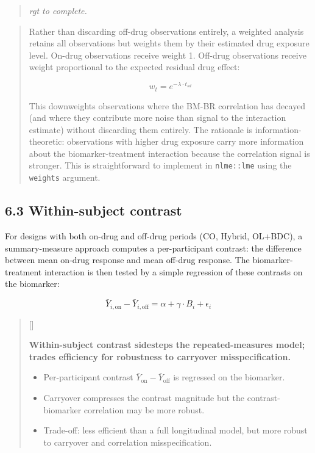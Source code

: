 \documentclass[
  11pt,
]{article}
\newcounter{pgraph}
\newenvironment{bullets}{%
  \stepcounter{pgraph}%
  \begin{quote}\small\sffamily\color[gray]{0.30}%
  {\normalfont\scriptsize\color[gray]{0.58}[\thepgraph]\enspace}}{%
  \end{quote}}
\newenvironment{rgt}{%
  \begin{quote}\small\itshape\color[RGB]{20,60,160}}{%
  \end{quote}}
\newenvironment{orig}{%
  \begin{quote}\normalsize\color[gray]{0.55}}{%
  \end{quote}}
\begin{document}
\begin{rgt}
rgt to complete.

\end{rgt}

\begin{orig}
Rather than discarding off-drug observations entirely, a weighted
analysis retains all observations but weights them by their estimated
drug exposure level. On-drug observations receive weight 1. Off-drug
observations receive weight proportional to the expected residual drug
effect:

\[w_t = e^{-\lambda \cdot t_{sd}}\]

This downweights observations where the BM-BR correlation has decayed
(and where they contribute more noise than signal to the interaction
estimate) without discarding them entirely. The rationale is
information-theoretic: observations with higher drug exposure carry more
information about the biomarker-treatment interaction because the
correlation signal is stronger. This is straightforward to implement in
\texttt{nlme::lme} using the \texttt{weights} argument.

\end{orig}

\subsection{6.3 Within-subject contrast}

For designs with both on-drug and off-drug periods (CO, Hybrid, OL+BDC),
a summary-measure approach computes a per-participant contrast: the
difference between mean on-drug response and mean off-drug response. The
biomarker-treatment interaction is then tested by a simple regression of
these contrasts on the biomarker:

\[\bar{Y}_{i,\text{on}} - \bar{Y}_{i,\text{off}} = \alpha +
\gamma \cdot B_i + \epsilon_i\]

\begin{bullets}

\textbf{Within-subject contrast sidesteps the repeated-measures
model; trades efficiency for robustness to carryover
misspecification.}

\begin{itemize}\setlength{\itemsep}{2pt}\setlength{\parskip}{0pt}
\item Per-participant contrast $\bar{Y}_{\text{on}} -
  \bar{Y}_{\text{off}}$ is regressed on the biomarker.
\item Carryover compresses the contrast magnitude but the
  contrast-biomarker correlation may be more robust.
\item Trade-off: less efficient than a full longitudinal model,
  but more robust to carryover and correlation misspecification.
\end{itemize}

\end{bullets}
\end{document}
